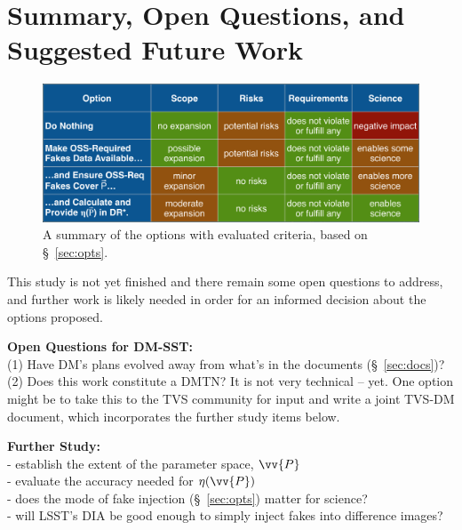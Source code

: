 \section{Summary, Open Questions, and Suggested Future Work}\label{sec:future}

\begin{figure}
\begin{center}
\includegraphics[width=15cm,trim={0cm 0cm 0cm 0cm}, clip]{figures/option_matrix.png}
\caption{A summary of the options with evaluated criteria, based on \S~\ref{sec:opts}. \label{fig:options}}
\end{center}
\end{figure}

This study is not yet finished and there remain some open questions to address, and further work is likely needed in order for an informed decision about the options proposed.

{\bf Open Questions for DM-SST:}\\
(1) Have DM's plans evolved away from what's in the documents (\S~\ref{sec:docs})? \\
(2) Does this work constitute a DMTN? It is not very technical -- yet. One option might be to take this to the TVS community for input and write a joint TVS-DM document, which incorporates the further study items below.

{\bf Further Study:}\\
 - establish the extent of the parameter space, $\vv{P}$\\
 - evaluate the accuracy needed for $\eta(\vv{P})$\\
 - does the mode of fake injection (\S~\ref{sec:opts}) matter for science?\\
 - will LSST's DIA be good enough to simply inject fakes into difference images?\\
